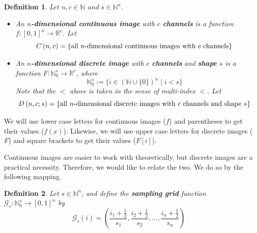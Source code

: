 \documentclass{article}
\newcommand{\R}{\mathbb{R}}
\newcommand{\Natural}{\mathbb{N}}
\newtheorem{defn}{Definition}
\begin{document}
	\newcommand{\unitcube}[1][n]{{[0,1]^{#1}}}
	\newcommand{\contim}[2]{{C\left(#1, #2\right)}}
	\newcommand{\discim}[3]{{D\left(#1, #2; #3\right)}}
	\begin{defn}\label{def:image}
		Let \(n, c \in \Natural\) and \(s \in \Natural^n\).
		\begin{itemize}
			\item An \(n\)\textbf{-dimensional continuous image} with \(c\) \textbf{channels} is a function \(f: \unitcube \to \R^c\). Let
			\begin{equation}\label{eq:cont_im_space}
				\contim{n}{c} = \{\textnormal{all }n\textnormal{-dimensional continuous images with }c\textnormal{ channels}\}
			\end{equation}
			
			\item An \(n\)\textbf{-dimensional discrete image} with \(c\) \textbf{channels} and \textbf{shape} \(s\) is a function \(F: \Natural_0^s \to \R^c\), where 
			\begin{equation*}
				\Natural_0^s := \{i \in (\Natural \cup \{0\})^n \mid i < s\}
			\end{equation*}
			Note that the \(<\) above is taken in the sense of multi-index \(<\). Let
			\begin{equation}\label{eq:disc_im_space}
				\discim{n}{c}{s} = \{\textnormal{all }n\textnormal{-dimensional discrete images with }c\textnormal{ channels and shape }s\}
			\end{equation}
		\end{itemize}
	\end{defn}
	
	We will use lower case letters for continuous images (\(f\)) and parentheses to get their values (\(f(x)\)). Likewise, we will use upper case letters for discrete images (\(F\)) and square brackets to get their values (\(F[i]\)). 
	
	Continuous images are easier to work with theoretically, but discrete images are a practical necessity. Therefore, we would like to relate the two. We do so by the following mapping.
	\newcommand{\grid}{\mathscr{G}}
	\begin{defn}\label{def:sampling_grid}
		Let \(s \in \Natural^n\), and define the \textbf{sampling grid} function \(\grid_s: \Natural_0^s \to [0,1]^n\) by
		\begin{equation}\label{eq:sampling_grid}
			\grid_s(i) = \left(\frac{i_1 + \frac{1}{2}}{s_1}, \frac{i_2 + \frac{1}{2}}{s_2}, \dots, \frac{i_n + \frac{1}{2}}{s_n}\right)
		\end{equation} 
	\end{defn}
\end{document}
